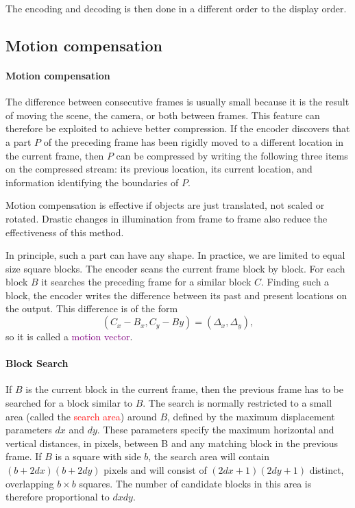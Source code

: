 \documentclass[a4paper, 11pt, openany]{book}
\numberwithin{equation}{section}
\theoremstyle{plain}
\theoremstyle{definition}
\newcommand{\Important}[1]{\textcolor{red}{#1}}
\newcommand{\Define}[1]{\textcolor{purple}{#1}}
\begin{document}
The encoding and decoding is then done in a different order to the display order.

\subsection{Motion compensation}

\paragraph{Motion compensation}
The difference between consecutive frames is usually small because it is the result of moving the scene, the camera, or both between frames. This feature can therefore be exploited to achieve better compression. If the encoder discovers that a part $P$ of the preceding frame has been rigidly moved to a different location in the current frame, then $P$ can be compressed
by writing the following three items on the compressed stream: its previous location,
its current location, and information identifying the boundaries of $P$. 

Motion compensation is effective if objects are just translated, not scaled or rotated.
Drastic changes in illumination from frame to frame also reduce the effectiveness of this
method.

In principle, such a part can have any shape. In practice, we are limited to equal size square
blocks. The encoder scans the current frame block by block. For each block $B$ it searches the preceding frame for a similar block $C$. Finding such a block, the encoder writes the difference between its past and present locations on the output. This difference is of the form
\[
    (C_x - B_x, C_y - By) = ( \Delta_x, \Delta_y),
\]
so it is called a \Define{motion vector}. 

\paragraph{Block Search} 
If $B$ is the current block in the current frame, then the previous frame has to be
searched for a block similar to $B$. The search is normally restricted to
a small area (called the \Important{search area}) around $B$, defined by the maximum displacement parameters $dx$ and $dy$. These parameters specify the maximum horizontal and vertical distances, in pixels, between B and any matching block in the previous frame. If $B$ is a square with side $b$, the search area will contain $(b + 2dx)(b + 2dy)$ pixels and will consist of $(2dx+1)(2dy +1)$ distinct, overlapping $b \times b$ squares. The number of
candidate blocks in this area is therefore proportional to $dxdy$.
\end{document}
